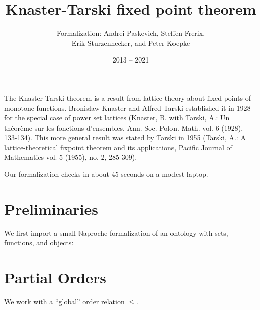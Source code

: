 \documentclass[english]{article}
\title{Knaster-Tarski fixed point theorem}
\author{\Naproche{} Formalization: Andrei Paskevich, Steffen Frerix,\\
Erik Sturzenhecker, and Peter Koepke}
\date{2013 -- 2021}
\begin{document}

  \maketitle

  The Knaster-Tarski theorem is a result from lattice theory about fixed points
  of monotone functions.
  Bronis\l aw Knaster and Alfred Tarski established it in 1928 for the special
  case of power set lattices (Knaster, B. with Tarski, A.: Un th\' eor\`eme sur
  les fonctions d'ensembles, Ann. Soc. Polon. Math. vol. 6 (1928), 133-134).
  This more general result was stated by Tarski in 1955 (Tarski, A.: A
  lattice-theoretical fixpoint theorem and its applications, Pacific Journal of
  Mathematics vol. 5 (1955), no. 2, 285-309).

  Our formalization checks in about 45 seconds on a modest laptop.

  \section{Preliminaries}
  We first import a small $\mathbb{N}$aproche formalization of an ontology with
  sets, functions, and objects:

  \begin{forthel}
  \end{forthel}

  \section{Partial Orders}
  We work with a ``global'' order relation $\leq$.
\end{document}
